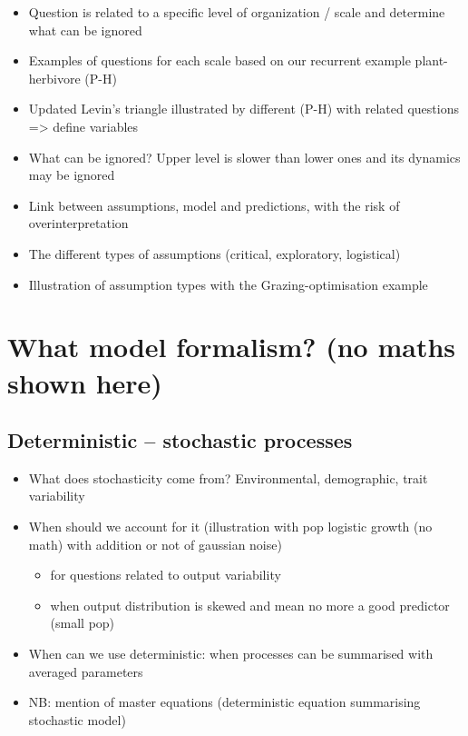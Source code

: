 \documentclass[
]{book}
\providecommand{\tightlist}{%
  \setlength{\itemsep}{0pt}\setlength{\parskip}{0pt}}
\theoremstyle{definition}
\theoremstyle{definition}
\theoremstyle{definition}
\theoremstyle{definition}
\theoremstyle{remark}
\begin{document}
\begin{itemize}
\tightlist
\item
  Question is related to a specific level of organization / scale and determine what can be ignored
\item
  Examples of questions for each scale based on our recurrent example plant-herbivore (P-H)
\item
  Updated Levin's triangle illustrated by different (P-H) with related questions =\textgreater{} define variables
\item
  What can be ignored? Upper level is slower than lower ones and its dynamics may be ignored
\item
  Link between assumptions, model and predictions, with the risk of overinterpretation
\item
  The different types of assumptions (critical, exploratory, logistical)
\item
  Illustration of assumption types with the Grazing-optimisation example
\end{itemize}

\section{What model formalism? (no maths shown here)}\label{what-model-formalism-no-maths-shown-here}

\subsection{Deterministic -- stochastic processes}\label{deterministic-stochastic-processes}

\begin{itemize}
\tightlist
\item
  What does stochasticity come from? Environmental, demographic, trait variability
\item
  When should we account for it (illustration with pop logistic growth (no math) with addition or not of gaussian noise)

  \begin{itemize}
  \tightlist
  \item
    for questions related to output variability
  \item
    when output distribution is skewed and mean no more a good predictor (small pop)
  \end{itemize}
\item
  When can we use deterministic: when processes can be summarised with averaged parameters
\item
  NB: mention of master equations (deterministic equation summarising stochastic model)
\end{itemize}
\end{document}
